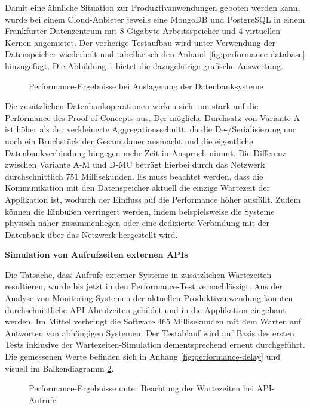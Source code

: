 Damit eine ähnliche Situation zur Produktivanwendungen geboten werden kann, wurde bei einem Cloud-Anbieter jeweils eine MongoDB und PostgreSQL in einem Frankfurter Datenzentrum mit 8 Gigabyte Arbeitsspeicher und 4 virtuellen Kernen angemietet. Der vorherige Testaufbau wird unter Verwendung der Datenspeicher wiederholt und tabellarisch den Anhand \ref{fig:performance-database} hinzugefügt. Die Abbildung \ref{fig:PerformanceDatabase} bietet die dazugehörige grafische Auswertung.

\begin{figure}[htpb]
	\centering
	\footnotesize
	
	\caption{Performance-Ergebnisse bei Auslagerung der Datenbanksysteme}
	\label{fig:PerformanceDatabase}
\end{figure}

Die zusätzlichen Datenbankoperationen wirken sich nun stark auf die Performance des Proof-of-Concepts aus. Der mögliche Durchsatz von Variante A ist höher als der verkleinerte Aggregationsschnitt, da die De-/Serialisierung nur noch ein Bruchstück der Gesamtdauer ausmacht und die eigentliche Datenbankverbindung hingegen mehr Zeit in Anspruch nimmt. Die Differenz zwischen Variante A-M und D-MC beträgt hierbei durch das Netzwerk durchschnittlich 751 Millisekunden. Es muss beachtet werden, dass die Kommunikation mit den Datenspeicher aktuell die einzige Wartezeit der Applikation ist, wodurch der Einfluss auf die Performance höher ausfällt. Zudem können die Einbußen verringert werden, indem beispielsweise die Systeme physisch näher zusammenliegen oder eine dedizierte Verbindung mit der Datenbank über das Netzwerk hergestellt wird.


\textbf{Simulation von Aufrufzeiten externen APIs}

Die Tatsache, dass Aufrufe externer Systeme in zusätzlichen Wartezeiten resultieren, wurde bis jetzt in den Performance-Test vernachlässigt. Aus der Analyse von Monitoring-Systemen der aktuellen Produktivanwendung konnten durchschnittliche API-Abrufzeiten gebildet und in die Applikation eingebaut werden. Im Mittel verbringt die Software 465 Millisekunden mit dem Warten auf Antworten von abhängigen Systemen. Der Testablauf wird auf Basis des ersten Tests inklusive der Wartezeiten-Simulation dementsprechend erneut durchgeführt. Die gemessenen Werte befinden sich in Anhang \ref{fig:performance-delay} und visuell im Balkendiagramm \ref{fig:PerformanceDelay}. 

\begin{figure}[htpb]
	\centering
	\footnotesize
	
	\caption{Performance-Ergebnisse unter Beachtung der Wartezeiten bei API-Aufrufe}
	\label{fig:PerformanceDelay}
\end{figure}

